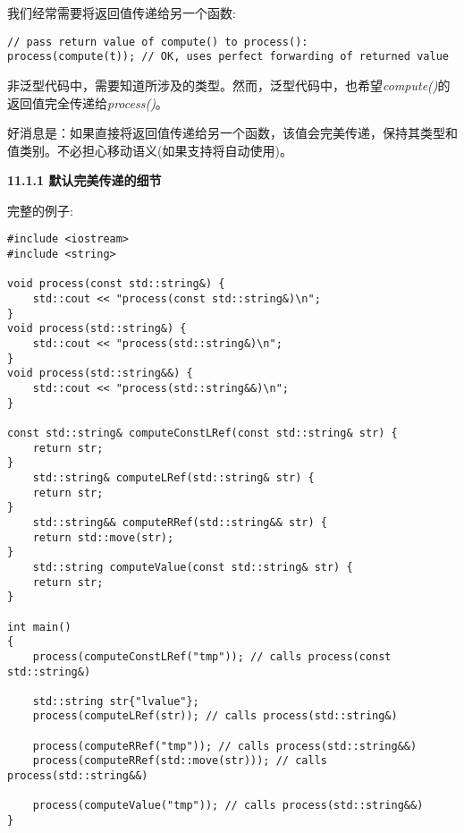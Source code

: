 我们经常需要将返回值传递给另一个函数:\par

\begin{lstlisting}[caption={}]
// pass return value of compute() to process():
process(compute(t)); // OK, uses perfect forwarding of returned value
\end{lstlisting}

非泛型代码中，需要知道所涉及的类型。然而，泛型代码中，也希望\textit{compute()}的返回值完全传递给\textit{process()}。\par

好消息是：如果直接将返回值传递给另一个函数，该值会完美传递，保持其类型和值类别。不必担心移动语义(如果支持将自动使用)。\par

\hspace*{\fill} \par %
\textbf{11.1.1 默认完美传递的细节}

完整的例子:\par

{\color{red}{generic/perfectpassing.cpp}}\par

\begin{lstlisting}[caption={}]
#include <iostream>
#include <string>

void process(const std::string&) {
	std::cout << "process(const std::string&)\n";
}
void process(std::string&) {
	std::cout << "process(std::string&)\n";
}
void process(std::string&&) {
	std::cout << "process(std::string&&)\n";
}

const std::string& computeConstLRef(const std::string& str) {
	return str;
}
	std::string& computeLRef(std::string& str) {
	return str;
}
	std::string&& computeRRef(std::string&& str) {
	return std::move(str);
}
	std::string computeValue(const std::string& str) {
	return str;
}

int main()
{
	process(computeConstLRef("tmp")); // calls process(const std::string&)
	
	std::string str{"lvalue"};
	process(computeLRef(str)); // calls process(std::string&)
	
	process(computeRRef("tmp")); // calls process(std::string&&)
	process(computeRRef(std::move(str))); // calls process(std::string&&)
	
	process(computeValue("tmp")); // calls process(std::string&&)
}
\end{lstlisting}

